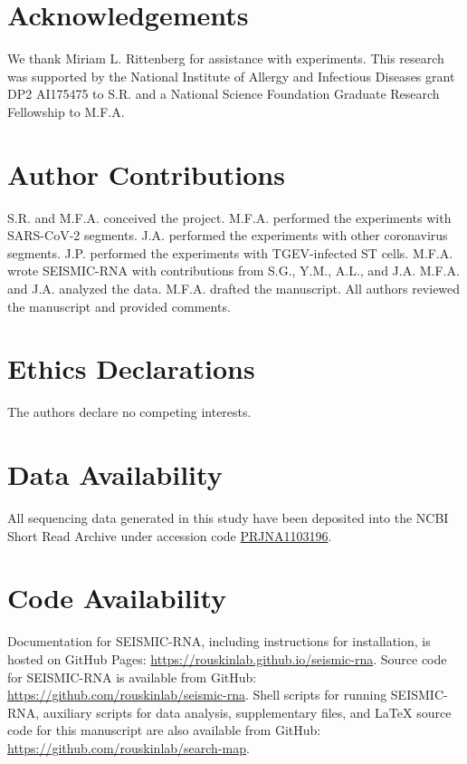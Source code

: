 \documentclass[main.tex]{subfiles}
\begin{document}
\section{Acknowledgements}

We thank Miriam L. Rittenberg for assistance with experiments. 
This research was supported by the National Institute of Allergy and Infectious Diseases grant DP2 AI175475 to S.R. and a National Science Foundation Graduate Research Fellowship to M.F.A.


\section{Author Contributions}

S.R. and M.F.A. conceived the project.
M.F.A. performed the experiments with SARS-CoV-2 segments.
J.A. performed the experiments with other coronavirus segments.
J.P. performed the experiments with TGEV-infected ST cells.
M.F.A. wrote SEISMIC-RNA with contributions from S.G., Y.M., A.L., and J.A.
M.F.A. and J.A. analyzed the data.
M.F.A. drafted the manuscript.
All authors reviewed the manuscript and provided comments.


\section{Ethics Declarations}

The authors declare no competing interests.


\section{Data Availability}

All sequencing data generated in this study have been deposited into the NCBI Short Read Archive under accession code \href{https://www.ncbi.nlm.nih.gov/bioproject/PRJNA1103196}{PRJNA1103196}.


\section{Code Availability}

Documentation for SEISMIC-RNA, including instructions for installation, is hosted on GitHub Pages: \url{https://rouskinlab.github.io/seismic-rna}.
Source code for SEISMIC-RNA is available from GitHub: \url{https://github.com/rouskinlab/seismic-rna}. 
Shell scripts for running SEISMIC-RNA, auxiliary scripts for data analysis, supplementary files, and LaTeX source code for this manuscript are also available from GitHub: \url{https://github.com/rouskinlab/search-map}.
\end{document}
